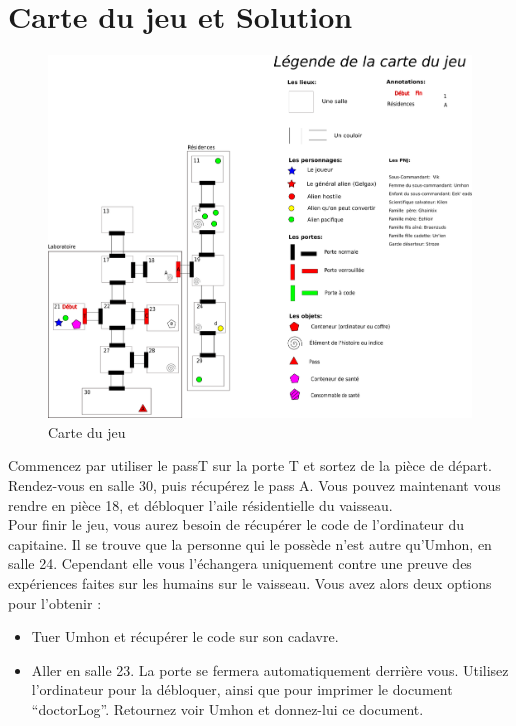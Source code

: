 \documentclass[./standalone.tex]{subfiles}
\begin{document}
\section{Carte du jeu et Solution}
\begin{center}
	\begin{figure}[h!]
	\includegraphics[scale=0.5]{images/v4.png}
	\caption{Carte du jeu}
	\label{carte_jeu}
	\end{figure}
\end{center}

Commencez par utiliser le passT sur la porte T et sortez de la pièce de départ. Rendez-vous en salle 30, puis récupérez le pass A. Vous pouvez maintenant vous rendre en pièce 18, et débloquer l’aile résidentielle du vaisseau.\\
 
Pour finir le jeu, vous aurez besoin de récupérer le code de l’ordinateur du capitaine. Il se trouve que la personne qui le possède n’est autre qu’Umhon, en salle 24. Cependant elle vous l’échangera uniquement contre une preuve des expériences faites sur les humains sur le vaisseau. Vous avez alors deux options pour l’obtenir :
\begin{itemize}
	\item Tuer Umhon et récupérer le code sur son cadavre.
	\item Aller en salle 23. La porte se fermera automatiquement derrière vous. Utilisez l’ordinateur pour la débloquer, ainsi que pour imprimer le document “doctorLog”. Retournez voir Umhon et donnez-lui ce document.\\
\end{itemize}
\end{document}
